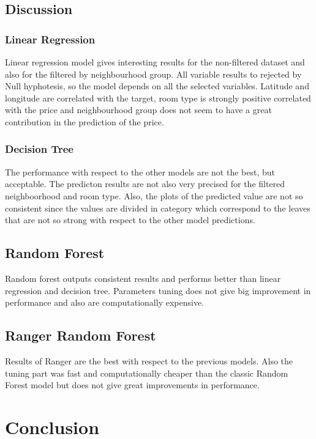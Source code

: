 \documentclass{FR16}
\begin{document}
\newpage
\subsection{Discussion}

\subsubsection{Linear Regression}
Linear regression model gives interesting results for the non-filtered dataset and also for the filtered by neighbourhood group.
All variable results to rejected by Null hyphotesis, so the model depends on all the selected variables.
Latitude and longitude are correlated with the target, room type is strongly positive correlated with the price and neighbourhood group does not seem to have
a great contribution in the prediction of the price.
\\

\subsubsection{Decision Tree}
The performance with respect to the other models are not the best, but acceptable. The predicton results are not also very precised for the filtered neighboorhood 
and room type. Also, the plots of the predicted value are not so consistent since the values are divided in category which correspond to the leaves that are not so strong
with respect to the other model predictions.
\\

\subsection{Random Forest}
Random forest outputs consistent results and performs  better than linear regression and decision tree. 
Parameters tuning does not give big improvement in performance and also are computationally expensive.
\\

\subsection{Ranger Random Forest}
Results of Ranger are the best with respect to the previous models. Also the tuning part was fast and computationally cheaper than 
the classic Random Forest model but does not give great improvements in performance.
\\

\section{Conclusion}
\end{document}
